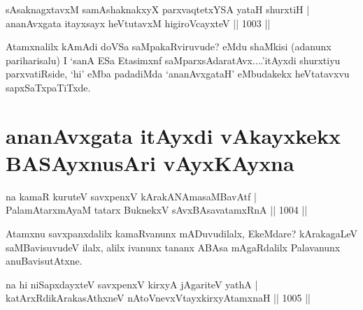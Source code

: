 
\begin{shl}
sAsaknagxtavxM samAshaknakxyX parxvaqtetxYSA yataH shurxtiH | \\
ananAvxgata itayxsayx heVtutavxM higiroVcayxteV \hfill||  1003 ||  
\end{shl}

\begin{artha}
Atamxnalilx kAmAdi doVSa saMpakaRviruvude? eMdu shaMkisi (adanunx pariharisalu) I `sanA ESa Etasimxnf saMparxsAdaratAvx....'itAyxdi shurxtiyu parxvatiRside, `hi' eMba padadiMda `ananAvxgataH' eMbudakekx heVtatavxvu sapxSaTxpaTiTxde.
\end{artha}

\section*{ananAvxgata itAyxdi vAkayxkekx BASAyxnusAri vAyxKAyxna}


\begin{shl}
na kamaR kuruteV savxpenxV kArakANAmasaMBavAtf | \\
PalamAtarxmAyaM tatarx BuknekxV \footnotemark[1]sAvxBAsavatamxRnA \hfill||  1004 ||  
\end{shl}

\begin{artha}
Atamxnu savxpanxdalilx kamaRvanunx mADuvudilalx, EkeMdare? kArakagaLeV saMBavisuvudeV ilalx, alilx ivanunx tananx ABAsa mAgaRdalilx Palavanunx anuBavisutAtxne.
\end{artha}


\begin{shl}
na hi niSapxdayxteV savxpenxV kirxyA jAgariteV yathA | \\
katArxRdikArakasAthxneV nAtoV\s nevxVtayxkirxyAtamxnaH \hfill||  1005 ||  
\end{shl}


